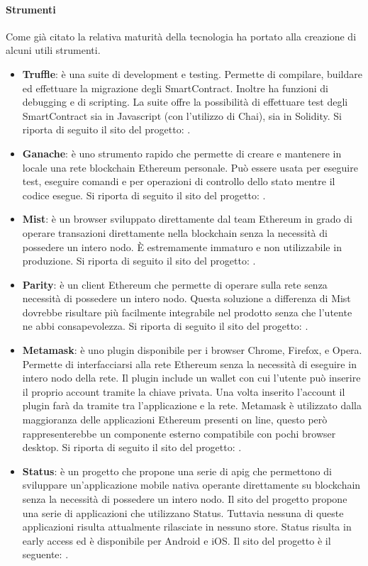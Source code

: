 \paragraph{Strumenti}
Come già citato la relativa maturità della tecnologia ha portato alla creazione di alcuni utili strumenti. 
\begin{itemize}
    \item \textbf{Truffle}: è una suite di development e testing. Permette di compilare, buildare ed effettuare la migrazione degli SmartContract. Inoltre ha funzioni di debugging e di scripting. La suite offre la possibilità di effettuare test degli SmartContract sia in Javascript (con l’utilizzo di Chai), sia in Solidity. Si riporta di seguito il sito del progetto: \cite{site:truffle}.
    \item \textbf{Ganache}: è uno strumento rapido che permette di creare e mantenere in locale una rete blockchain Ethereum personale. Può essere usata per eseguire test, eseguire comandi e per operazioni di controllo dello stato mentre il codice esegue. Si riporta di seguito il sito del progetto: \cite{site:ganache}.
    \item \textbf{Mist}: è un browser sviluppato direttamente dal team Ethereum in grado di operare transazioni direttamente nella blockchain senza la necessità di possedere un intero nodo. È estremamente immaturo e non utilizzabile in produzione. Si riporta di seguito il sito del progetto: \cite{site:mist}.
    \item \textbf{Parity}: è un client Ethereum che permette di operare sulla rete senza necessità di possedere un intero nodo. Questa soluzione a differenza di Mist dovrebbe risultare più facilmente integrabile nel prodotto senza che l’utente ne abbi consapevolezza. Si riporta di seguito il sito del progetto: \cite{site:parity} .
    \item \textbf{Metamask}: è uno plugin disponibile per i browser Chrome, Firefox, e Opera. Permette di interfacciarsi alla rete Ethereum senza la necessità di eseguire in intero nodo della rete. Il plugin include un wallet con cui l’utente può inserire il proprio account tramite la chiave privata. Una volta inserito l’account il plugin farà da tramite tra l’applicazione e la rete.
    Metamask è utilizzato dalla maggioranza delle applicazioni Ethereum presenti on line, questo però rappresenterebbe un componente esterno compatibile con pochi browser desktop. Si riporta di seguito il sito del progetto: \cite{site:metamask} .
    \item \textbf{Status}: è un progetto che propone una serie di \gls{apig} che permettono di sviluppare un’applicazione mobile nativa operante direttamente su blockchain senza la necessità di possedere un intero nodo. Il sito del progetto propone una serie di applicazioni che utilizzano Status. Tuttavia nessuna di queste applicazioni risulta attualmente rilasciate in nessuno store. Status risulta in early access ed è disponibile per Android e iOS. Il sito del progetto è il seguente: \cite{site:status}.

\end{itemize}
